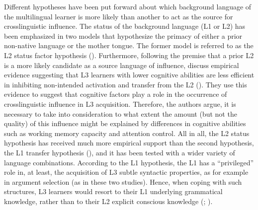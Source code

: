 \documentclass[output=paper]{../langscibook}
\begin{document}
Different hypotheses have been put forward about which background language of the multilingual learner is more likely than another to act as the source for crosslinguistic influence. The status of the background language (L1 or L2) has been emphasized in two models that hypothesize the primacy of either a prior non-native language or the mother tongue. The former model is referred to as the L2 status factor hypothesis (\citealt{BardelFalk2007, BardelFalk2012, FalkBardel2010, BardelSánchez2017}). Furthermore, following the premise that a prior L2 is a more likely candidate as a source language of influence, \citet{BardelSánchez2017} discuss empirical evidence suggesting that L3 learners with lower cognitive abilities are less efficient in inhibiting non-intended activation and transfer from the L2 (\citealt{SánchezBardel2016, Sánchez2019Complexity}). They use this evidence to suggest that cognitive factors play a role in the occurrence of crosslinguistic influence in L3 acquisition. Therefore, the authors argue, it is necessary to take into consideration to what extent the amount (but not the quality) of this influence might be explained by differences in cognitive abilities such as working memory capacity and attention control. All in all, the L2 status hypothesis has received much more empirical support than the second hypothesis, the L1 transfer hypothesis (\citealt{NaRanongLeung2009, Hermas2010}), and it has been tested with a wider variety of language combinations. According to the L1 hypothesis, the L1 has a “privileged” role in, at least, the acquisition of L3 subtle syntactic properties, as for example in argument selection (as in these two studies). Hence, when coping with such structures, L3 learners would resort to their L1 underlying grammatical knowledge, rather than to their L2 explicit conscious knowledge (\citealt[185]{NaRanongLeung2009}; \citealt[358]{Hermas2010}).
\end{document}
